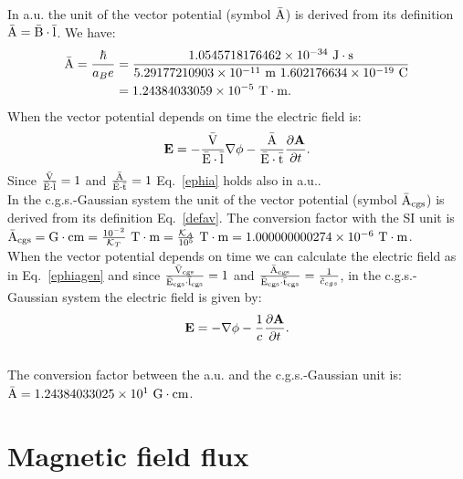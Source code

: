 \documentclass[12pt,a4paper,twoside]{report}
\def\hbarf{1.0545718176462\times 10^{-34}}
\def\e{1.602176634\times 10^{-19}}
\def\abohr{5.29177210903\times 10^{-11}}
\def\barav{1.24384033059\times 10^{-5}}
\def\avtoav{1.000000000274\times 10^{-6}}
\def\baravcgs{1.24384033025\times 10^{1}}
\begin{document}
{{\color{web-blue} In a.u. the unit of the vector potential
(symbol ${\rm \bar A}$) is derived from its definition ${\rm \bar A} = {\rm \bar B}\cdot {\rm \bar l}$.
We have:
\begin{align}
{\rm \bar A} = {\hbar \over a_B e}&= {\hbarf\ {\rm J}\cdot {\rm s} \over \abohr\ {\rm m}\ \e\ {\rm C}}
\nonumber \\ 
&= \barav\ {\rm T}\cdot {\rm m}.
\end{align}
When the vector potential depends on time the electric field is:
\begin{equation}
{\bf E}=-{{\rm \bar V} \over {\rm \bar E}\cdot {\rm \bar l}} \nabla \phi -
{{\rm \bar A} \over {\rm \bar E}\cdot {\rm \bar t}} {\partial {\bf A} \over \partial t}.
\label{ephiagen}
\end{equation}
Since ${{\rm \bar V} \over {\rm \bar E}\cdot {\rm \bar l}}=1$ and 
${{\rm \bar A} \over {\rm \bar E}\cdot {\rm \bar t}}=1$ Eq.~\ref{ephia} holds also in a.u..
}
\\

{\color{orange} In the c.g.s.-Gaussian system the unit of the vector 
potential (symbol ${\rm \bar A_{cgs}}$) is derived from its definition 
Eq.~\ref{defav}.
The conversion factor with the SI unit is 
${\rm \bar A_{cgs}} = {\rm G} \cdot {\rm cm} = {10^{-2}\over \mathcal{K}_T}\ {\rm T}\cdot {\rm m}=
{\mathcal{K}_A \over 10^5}\ {\rm T}\cdot {\rm m}=\avtoav\ {\rm T}\cdot {\rm m}$. \\

When the vector potential depends on time we can calculate the electric
field as in Eq.~\ref{ephiagen} and since 
${{\rm \bar V_{cgs}} \over {\rm \bar E_{cgs}}\cdot {\rm \bar l_{cgs}}}=1$
and ${{\rm \bar A_{cgs}} \over {\rm \bar E_{cgs}} \cdot {\rm \bar t_{cgs}}}={1\over 
\tilde c_{cgs}}$, in the 
c.g.s.-Gaussian system the electric field is given by:
\begin{equation}
{\bf E}=-\nabla \phi -
{1 \over c} {\partial {\bf A} \over \partial t}.
\end{equation}
}
\\

{\color{green}
The conversion factor between the a.u. and the c.g.s.-Gaussian unit is:
${\rm \bar A} = \baravcgs\ {\rm G}\cdot {\rm cm}$.
}

\newpage
{\color{coral}\section{Magnetic field flux}}
\color{black}

}
\end{document}
